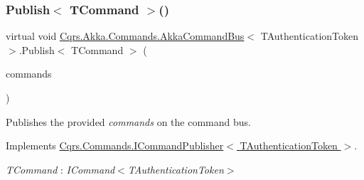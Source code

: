 \subsubsection{\texorpdfstring{Publish$<$ T\+Command $>$()}{Publish< TCommand >()}\hspace{0.1cm}{\footnotesize\ttfamily [2/2]}}
{\footnotesize\ttfamily virtual void \hyperlink{classCqrs_1_1Akka_1_1Commands_1_1AkkaCommandBus}{Cqrs.\+Akka.\+Commands.\+Akka\+Command\+Bus}$<$ T\+Authentication\+Token $>$.Publish$<$ T\+Command $>$ (\begin{DoxyParamCaption}\item[{I\+Enumerable$<$ T\+Command $>$}]{commands }\end{DoxyParamCaption})\hspace{0.3cm}{\ttfamily [virtual]}}



Publishes the provided {\itshape commands}  on the command bus. 



Implements \hyperlink{interfaceCqrs_1_1Commands_1_1ICommandPublisher_af0f033c0b949e5650032e4f00b11b595_af0f033c0b949e5650032e4f00b11b595}{Cqrs.\+Commands.\+I\+Command\+Publisher$<$ T\+Authentication\+Token $>$}.

\begin{Desc}
\item[Type Constraints]\begin{description}
\item[{\em T\+Command} : {\em I\+Command$<$T\+Authentication\+Token$>$}]\end{description}
\end{Desc}
\mbox{\label{classCqrs_1_1Akka_1_1Commands_1_1AkkaCommandBus_a8e1291f0259ac80e393c02bb119159a5_a8e1291f0259ac80e393c02bb119159a5}} 
